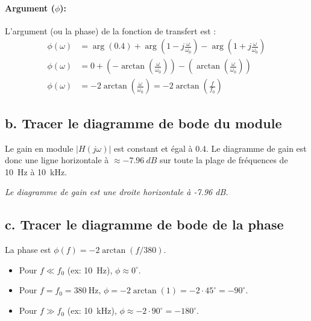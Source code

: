 \documentclass[12pt,a4paper]{article}
\begin{document}
\paragraph{Argument (\(\phi\)):}
L'argument (ou la phase) de la fonction de transfert est :
\begin{align*}
    \phi(\omega) &= \arg(0.4) + \arg\left(1 - j\frac{\omega}{\omega_0}\right) - \arg\left(1 + j\frac{\omega}{\omega_0}\right) \\
    \phi(\omega) &= 0 + \left(-\arctan\left(\frac{\omega}{\omega_0}\right)\right) - \left(\arctan\left(\frac{\omega}{\omega_0}\right)\right) \\
    \phi(\omega) &= -2 \arctan\left(\frac{\omega}{\omega_0}\right) = -2 \arctan\left(\frac{f}{f_0}\right)
\end{align*}

\subsection*{b. Tracer le diagramme de bode du module}
Le gain en module \(|H(j\omega)|\) est constant et égal à 0.4. Le diagramme de gain est donc une ligne horizontale à \(\approx \SI{-7.96}{dB}\) sur toute la plage de fréquences de \SI{10}{\hertz} à \SI{10}{\kilo\hertz}.

\begin{center}
    \textit{Le diagramme de gain est une droite horizontale à -7.96 dB.}
\end{center}

\subsection*{c. Tracer le diagramme de bode de la phase}
La phase est \(\phi(f) = -2 \arctan(f/380)\).
\begin{itemize}
    \item Pour \(f \ll f_0\) (ex: \SI{10}{\hertz}), \(\phi \approx 0^\circ\).
    \item Pour \(f = f_0 = \SI{380}{\hertz}\), \(\phi = -2 \arctan(1) = -2 \cdot 45^\circ = -90^\circ\).
    \item Pour \(f \gg f_0\) (ex: \SI{10}{\kilo\hertz}), \(\phi \approx -2 \cdot 90^\circ = -180^\circ\).
\end{itemize}
\end{document}
